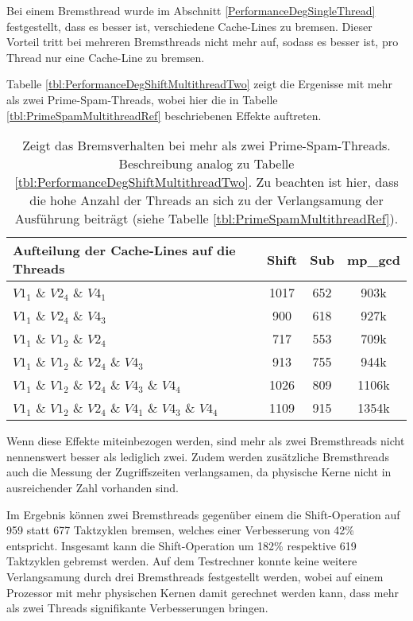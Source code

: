 Bei einem Bremsthread wurde im Abschnitt \ref{PerformanceDegSingleThread} festgestellt, dass es besser ist, verschiedene Cache-Lines zu bremsen.
Dieser Vorteil tritt bei mehreren Bremsthreads nicht mehr auf, sodass es besser ist, pro Thread nur eine Cache-Line zu bremsen.

Tabelle \ref{tbl:PerformanceDegShiftMultithreadTwo} zeigt die Ergenisse mit mehr als zwei Prime-Spam-Threads, wobei hier die in Tabelle \ref{tbl:PrimeSpamMultithreadRef} beschriebenen Effekte auftreten.

\begin{table}[h]
\caption{Zeigt das Bremsverhalten bei mehr als zwei Prime-Spam-Threads. Beschreibung analog zu Tabelle \ref{tbl:PerformanceDegShiftMultithreadTwo}. Zu beachten ist hier, dass die hohe Anzahl der Threads an sich zu der Verlangsamung der Ausführung beiträgt (siehe Tabelle \ref{tbl:PrimeSpamMultithreadRef}).}
\label{tbl:PerformanceDegShiftMultithreadThreePlus}
\begin{tabular}{lccc}
\toprule
Aufteilung der Cache-Lines auf die Threads & Shift & Sub & mp\_gcd \\
\midrule
$V1_1$ \& $V2_4$ \& $V4_1$                             & 1017  & 652 & 903k    \\
$V1_1$ \& $V2_4$ \& $V4_3$                            & 900   & 618 & 927k    \\
$V1_1$ \& $V1_2$ \& $V2_4$                             & 717   & 553 & 709k    \\
$V1_1$ \& $V1_2$ \& $V2_4$ \& $V4_3$                      & 913   & 755 & 944k    \\
$V1_1$ \& $V1_2$ \& $V2_4$ \& $V4_3$ \& $V4_4$               & 1026  & 809 & 1106k   \\
$V1_1$ \& $V1_2$ \& $V2_4$ \& $V4_1$ \& $V4_3$ \& $V4_4$         & 1109  & 915 & 1354k  \\
\bottomrule
\end{tabular}
\end{table}

Wenn diese Effekte miteinbezogen werden, sind mehr als zwei Bremsthreads nicht nennenswert besser als lediglich zwei.
Zudem werden zusätzliche Bremsthreads auch die Messung der Zugriffszeiten verlangsamen, da physische Kerne nicht in ausreichender Zahl vorhanden sind.

Im Ergebnis können zwei Bremsthreads gegenüber einem die Shift-Operation auf 959 statt 677 Taktzyklen bremsen, welches einer Verbesserung von 42\% entspricht.
Insgesamt kann die Shift-Operation um 182\% respektive 619 Taktzyklen gebremst werden.
Auf dem Testrechner konnte keine weitere Verlangsamung durch drei Bremsthreads festgestellt werden, wobei auf einem Prozessor mit mehr physischen Kernen damit gerechnet werden kann, dass mehr als zwei Threads signifikante Verbesserungen bringen.


